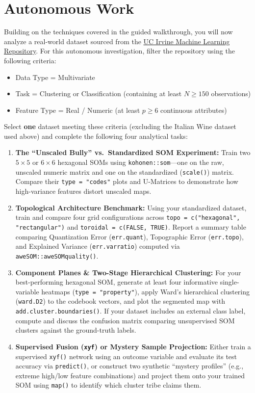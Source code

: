 \documentclass[11pt]{article}
\begin{document}
\section{Autonomous Work}
\label{sec:work}

Building on the techniques covered in the guided walkthrough, you will now analyze a real-world dataset sourced from the \href{https://archive.ics.uci.edu/datasets}{UC Irvine Machine Learning Repository}. For this autonomous investigation, filter the repository using the following criteria:

\begin{itemize}
  \item Data Type = Multivariate
  \item Task = Clustering or Classification (containing at least $N \ge 150$ observations)
  \item Feature Type = Real / Numeric (at least $p \ge 6$ continuous attributes)
\end{itemize}

Select \textbf{one} dataset meeting these criteria (excluding the Italian Wine dataset used above) and complete the following four analytical tasks:

\begin{enumerate}
  \item \textbf{The ``Unscaled Bully'' vs.\ Standardized SOM Experiment:} Train two $5 \times 5$ or $6 \times 6$ hexagonal SOMs using \texttt{kohonen::som}---one on the raw, unscaled numeric matrix and one on the standardized (\texttt{scale()}) matrix. Compare their \texttt{type = "codes"} plots and U-Matrices to demonstrate how high-variance features distort unscaled maps.
  \item \textbf{Topological Architecture Benchmark:} Using your standardized dataset, train and compare four grid configurations across \texttt{topo = c("hexagonal", "rectangular")} and \texttt{toroidal = c(FALSE, TRUE)}. Report a summary table comparing Quantization Error (\texttt{err.quant}), Topographic Error (\texttt{err.topo}), and Explained Variance (\texttt{err.varratio}) computed via \texttt{aweSOM::aweSOMquality()}.
  \item \textbf{Component Planes \& Two-Stage Hierarchical Clustering:} For your best-performing hexagonal SOM, generate at least four informative single-variable heatmaps (\texttt{type = "property"}), apply Ward's hierarchical clustering (\texttt{ward.D2}) to the codebook vectors, and plot the segmented map with \texttt{add.cluster.boundaries()}. If your dataset includes an external class label, compute and discuss the confusion matrix comparing unsupervised SOM clusters against the ground-truth labels.
  \item \textbf{Supervised Fusion (\texttt{xyf}) or Mystery Sample Projection:} Either train a supervised \texttt{xyf()} network using an outcome variable and evaluate its test accuracy via \texttt{predict()}, or construct two synthetic ``mystery profiles'' (e.g., extreme high/low feature combinations) and project them onto your trained SOM using \texttt{map()} to identify which cluster tribe claims them.
\end{enumerate}
\end{document}
